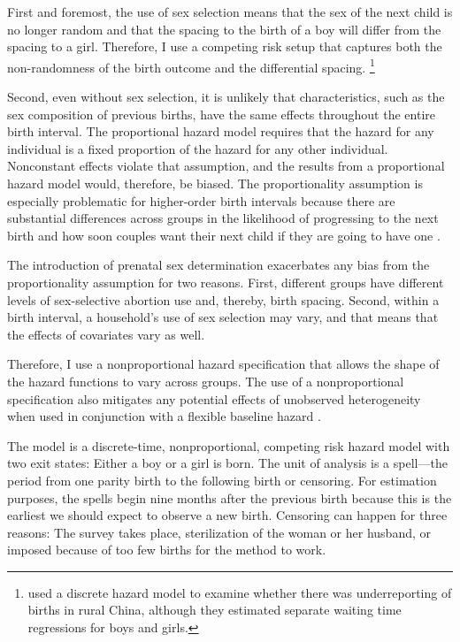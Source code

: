 \documentclass[12pt,letterpaper]{article}
\begin{document}
First and foremost, the use of sex selection means that the sex of the next child is 
no longer random and that the spacing to the birth of a boy will differ from the 
spacing to a girl. 
Therefore, I use a competing risk setup that captures both the non-randomness of 
the birth outcome and the differential spacing.%
\footnote{
\cite{Merli2000} used a discrete hazard model to examine whether 
there was underreporting of births in rural China, although they 
estimated separate waiting time regressions for boys and girls.
}

Second, even without sex selection, it is unlikely that characteristics, such as 
the sex composition of previous births, have the same effects throughout the entire 
birth interval. 
The proportional hazard model requires that the hazard for any individual is a 
fixed proportion of the hazard for any other individual. 
Nonconstant effects violate that assumption, and the results from a proportional hazard 
model would, therefore, be biased. 
The proportionality assumption is especially problematic for higher-order birth 
intervals because there are substantial differences across groups in the likelihood 
of progressing to the next birth and how soon couples want their next child if they 
are going to have one \citep{Whitworth2002,Bhalotra2008,Kim2010}.

The introduction of prenatal sex determination exacerbates any bias from
the proportionality assumption for two reasons. 
First, different groups have different levels of sex-selective abortion use and, thereby, 
birth spacing. 
Second, within a birth interval, a household's use of sex selection may vary, and that
means that the effects of covariates vary as well.

Therefore, I use a nonproportional hazard specification that allows the shape of the 
hazard functions to vary across groups.
The use of a nonproportional specification also mitigates any potential effects 
of unobserved heterogeneity when used in conjunction with a flexible baseline hazard 
\citep{Dolton1995}.

The model is a discrete-time, nonproportional, competing risk hazard model with two 
exit states: Either a boy or a girl is born. 
The unit of analysis is a spell---the period from one parity birth to the following 
birth or censoring. 
For estimation purposes, the spells begin nine months after the previous birth because 
this is the earliest we should expect to observe a new birth. 
Censoring can happen for three reasons: The survey takes place, sterilization of the 
woman or her husband, or imposed because of too few births for the method to work.
\end{document}
